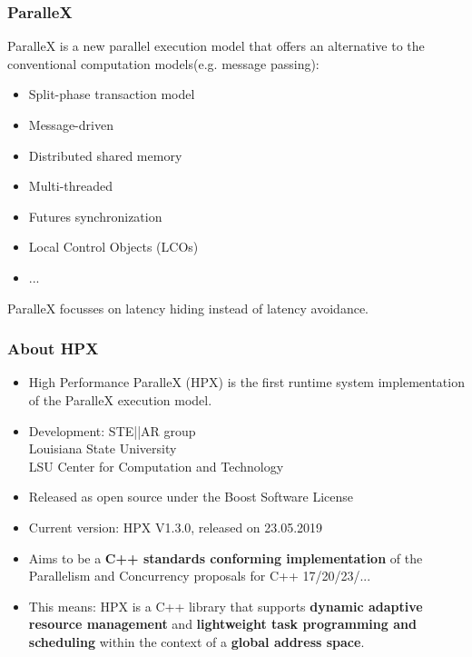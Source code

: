 \begin{frame}
\frametitle{ParalleX}
ParalleX is a new parallel execution model that offers an alternative to the conventional computation models(e.g. message passing):
\begin{itemize}
  \item Split-phase transaction model
  \item Message-driven
  \item Distributed shared memory
  \item Multi-threaded
  \item Futures synchronization
  \item Local Control Objects (LCOs)
  \item ...
\end{itemize}
ParalleX focusses on latency hiding instead of latency avoidance.
\end{frame}

\begin{frame}
\frametitle{About HPX}
\begin{itemize}
  \item High Performance ParalleX (HPX) is the first runtime system implementation of the ParalleX execution model.
  \item Development: STE||AR group \\ Louisiana State University \\ LSU Center for Computation and Technology
  \item Released as open source under the Boost Software License
  \item Current version: HPX V1.3.0, released on 23.05.2019
  \item Aims to be a \textbf{C++ standards conforming implementation} of the Parallelism and Concurrency proposals for C++ 17/20/23/...
  \item This means: HPX is a C++ library that supports \textbf{dynamic adaptive resource management} and \textbf{lightweight task programming and scheduling} within the context of a \textbf{global address space}. 
\end{itemize}
\end{frame}

